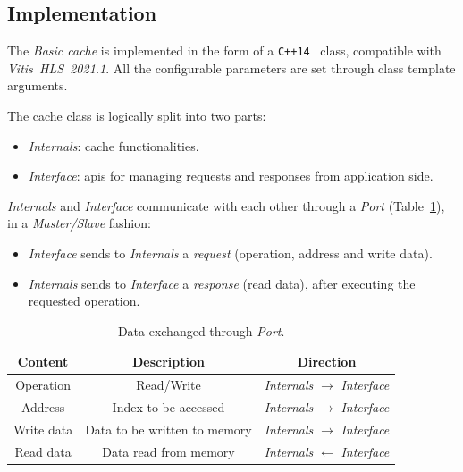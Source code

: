 \documentclass[11pt,a4paper,oneside]{memoir}
\begin{document}
\subsection{Implementation}\label{subsec:basic_impl}
The \emph{Basic cache} is implemented in the form of a
\texttt{C++14}~\cite{cpp14} class, compatible with
\emph{Vitis\texttrademark~HLS~2021.1}.
All the configurable parameters are set through class template arguments.

The cache class is logically split into two parts:
\begin{itemize}
	\item \emph{Internals}: cache functionalities.
	\item \emph{Interface}: \acsp{api} for managing requests and responses
		from application side.
\end{itemize}

\emph{Internals} and \emph{Interface} communicate with each other through a
\emph{Port} (Table~\ref{tab:port}), in a \emph{Master/Slave} fashion:
\begin{itemize}
	\item \emph{Interface} sends to \emph{Internals} a \emph{request}
		(operation, address and write data).
	\item \emph{Internals} sends to \emph{Interface} a \emph{response}
		(read data), after executing the requested operation.
\end{itemize}

\begin{table}
	\begin{center}
		\begin{tabular}{ccc}
			\hline
			\rowcolor{gray!50}
			\textbf{Content} & \textbf{Description} &
			\textbf{Direction} \\
			\hline
			Operation & Read/Write &
			\emph{Internals} $\rightarrow$ \emph{Interface} \\
			\rowcolor{gray!25}
			Address & Index to be accessed &
			\emph{Internals} $\rightarrow$ \emph{Interface} \\
			Write data & Data to be written to memory &
			\emph{Internals} $\rightarrow$ \emph{Interface} \\
			\rowcolor{gray!25}
			Read data & Data read from memory &
			\emph{Internals} $\leftarrow$ \emph{Interface} \\
			\hline
		\end{tabular}
	\end{center}
	\caption{Data exchanged through \emph{Port}.}
	\label{tab:port}
\end{table}
\end{document}
